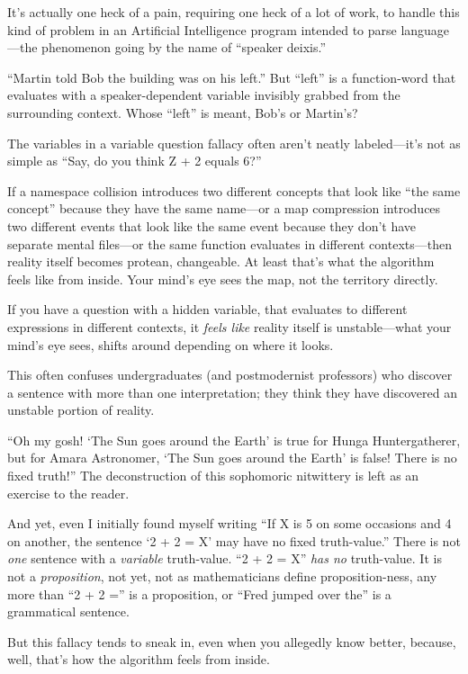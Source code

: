 {
 It's actually one heck of a pain, requiring one
heck of a lot of work, to handle this kind of problem in an Artificial
Intelligence program intended to parse language---the phenomenon going
by the name of ``speaker deixis.''}

{
 ``Martin told Bob the building was on his
left.'' But
``left'' is a function-word that
evaluates with a speaker-dependent variable invisibly grabbed from the
surrounding context. Whose ``left''
is meant, Bob's or Martin's?}

{
 The variables in a variable question fallacy often
aren't neatly labeled---it's not as
simple as ``Say, do you think Z + 2 equals
6?''}

{
 If a namespace collision introduces two different concepts that
look like ``the same concept''
because they have the same name---or a map compression introduces two
different events that look like the same event because they
don't have separate mental files---or the same function
evaluates in different contexts---then reality itself becomes protean,
changeable. At least that's what the algorithm feels
like from inside. Your mind's eye sees the map, not the
territory directly.}

{
 If you have a question with a hidden variable, that evaluates to
different expressions in different contexts, it \textit{feels like}
reality itself is unstable---what your mind's eye sees,
shifts around depending on where it looks.}

{
 This often confuses undergraduates (and postmodernist professors)
who discover a sentence with more than one interpretation; they think
they have discovered an unstable portion of reality.}

{
 ``Oh my gosh! `The Sun goes around
the Earth' is true for Hunga Huntergatherer, but for
Amara Astronomer, `The Sun goes around the
Earth' is false! There is no fixed
truth!'' The deconstruction of this sophomoric
nitwittery is left as an exercise to the reader.}

{
 And yet, even I initially found myself writing
``If X is 5 on some occasions and 4 on another, the
sentence `2 + 2 = X' may have no fixed
truth-value.'' There is not \textit{one} sentence
with a \textit{variable} truth-value. ``2 + 2 =
X'' \textit{has no} truth-value. It is not a
\textit{proposition}, not yet, not as mathematicians define
proposition-ness, any more than ``2 + 2
='' is a proposition, or ``Fred
jumped over the'' is a grammatical sentence.}

{
 But this fallacy tends to sneak in, even when you allegedly know
better, because, well, that's how the algorithm feels
from inside.}

